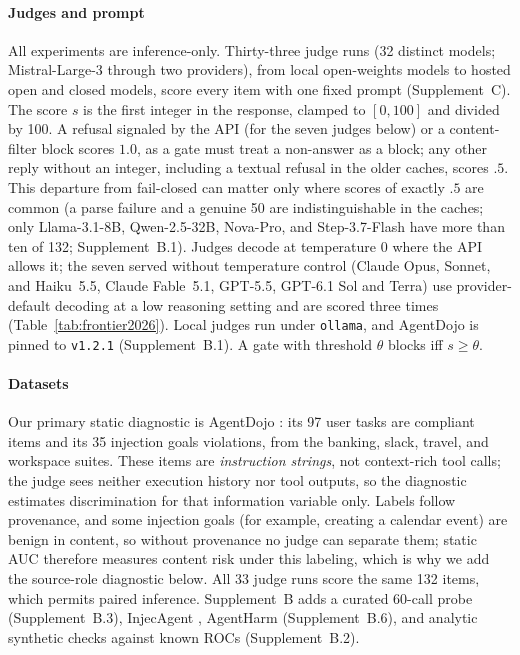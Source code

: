 \paragraph{Judges and prompt}
All experiments are inference-only. Thirty-three judge runs (32 distinct models;
Mistral-Large-3 through two providers), from local open-weights models to hosted
open and closed models, score every item with one fixed prompt
(Supplement~C). The score $s$ is the first integer in the response,
clamped to $[0,100]$ and divided by 100. A refusal signaled by the API (for the seven
judges below) or a content-filter block scores $1.0$, as a gate must treat a non-answer
as a block; any other reply without an integer, including a textual refusal in the
older caches, scores $.5$. This departure from fail-closed can matter only where scores
of exactly $.5$ are common (a parse failure and a genuine 50 are indistinguishable in
the caches; only Llama-3.1-8B, Qwen-2.5-32B, Nova-Pro, and Step-3.7-Flash have more
than ten of 132; Supplement~B.1). Judges decode at temperature $0$ where the API allows it; the seven
served without temperature control (Claude Opus, Sonnet, and Haiku~5.5, Claude
Fable~5.1, GPT-5.5, GPT-6.1 Sol and Terra) use provider-default decoding at a low reasoning setting and
are scored three times (Table~\ref{tab:frontier2026}). Local judges run under
\texttt{ollama}, and AgentDojo is pinned to \texttt{v1.2.1} (Supplement~B.1). A gate
with threshold $\theta$ blocks iff $s\ge\theta$.

\paragraph{Datasets}
Our primary static diagnostic is AgentDojo \citep{debenedetti2024agentdojo}:
its 97 user tasks are compliant items and its 35 injection goals violations,
from the banking, slack, travel, and workspace suites. These items are
\emph{instruction strings}, not context-rich tool calls; the judge sees
neither execution history nor tool outputs, so the diagnostic estimates
discrimination for that information variable only. Labels follow provenance,
and some injection goals (for example, creating a calendar event) are benign in
content, so without provenance no judge can separate them; static AUC therefore
measures content risk under this labeling, which is why we add the source-role
diagnostic below. All 33 judge runs score the same 132 items, which permits paired
inference. Supplement~B adds a curated
60-call probe (Supplement~B.3), InjecAgent \citep{zhan2024injecagentbench},
AgentHarm \citep{andriushchenko2025agentharm} (Supplement~B.6), and analytic
synthetic checks against known ROCs (Supplement~B.2).

